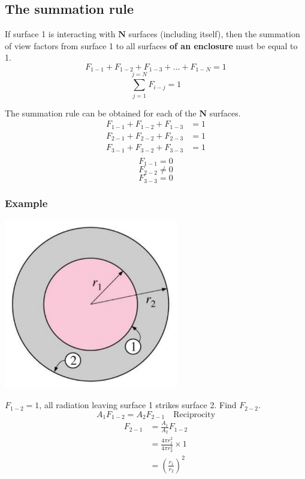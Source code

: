 \documentclass[11pt]{article}
\begin{document}
\subsection{The summation rule}
\label{sec:org54ec181}
If surface 1 is interacting with \(\boldsymbol{N}\) surfaces (including itself), then the summation of view factors from surface 1 to all surfaces \textbf{of an enclosure} must be equal to 1.
\[F_{1-1} + F_{1-2} + F_{1-3} + \ldots + F_{1-N} = 1\]
\[\sum_{j=1}^{j=N} F_{i-j} = 1\]

The summation rule can be obtained for each of the \(\boldsymbol{N}\) surfaces.
\begin{align*}
F_{1-1} + F_{1-2} + F_{1-3} &= 1 \\
F_{2-1} + F_{2-2} + F_{2-3} &= 1 \\
F_{3-1} + F_{3-2} + F_{3-3} &= 1 \\
\end{align*}
\[F_{1-1} = 0\]
\[F_{2-2} \ne 0\]
\[F_{3-3} = 0\]

 \newpage

\subsubsection{Example}
\label{sec:org31036f7}
\begin{center}
\includegraphics[height=20em]{./images/sphere-enclosed-within-another-sphere-diagram.png}
\end{center}
\(F_{1-2} = 1\), all radiation leaving surface 1 strikes surface 2. Find \(F_{2-2}\).
\[A_1 F_{1-2} = A_2 F_{2-1} \quad \text{Reciprocity}\]
\begin{align*}
F_{2-1} &= \frac{A_1}{A_2} F_{1-2} \\
&= \frac{4 \pi r_1^2}{4 \pi r_2^2} \times 1 \\
&= \left(\frac{r_1}{r_2} \right)^2
\end{align*}
\end{document}
